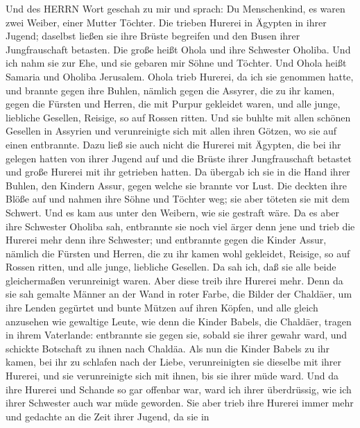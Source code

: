  Und des HERRN Wort geschah zu mir und sprach: 
Du Menschenkind, es waren zwei Weiber, einer Mutter Töchter.
 Die trieben Hurerei in Ägypten in ihrer Jugend; daselbst
ließen sie ihre Brüste begreifen und den Busen ihrer Jungfrauschaft
betasten.  Die große heißt Ohola und ihre Schwester Oholiba.
Und ich nahm sie zur Ehe, und sie gebaren mir Söhne und Töchter. Und
Ohola heißt Samaria und Oholiba Jerusalem.  Ohola trieb
Hurerei, da ich sie genommen hatte, und brannte gegen ihre Buhlen,
nämlich gegen die Assyrer, die zu ihr kamen,  gegen die
Fürsten und Herren, die mit Purpur gekleidet waren, und alle junge,
liebliche Gesellen, Reisige, so auf Rossen ritten.  Und sie
buhlte mit allen schönen Gesellen in Assyrien und verunreinigte sich mit
allen ihren Götzen, wo sie auf einen entbrannte.  Dazu ließ
sie auch nicht die Hurerei mit Ägypten, die bei ihr gelegen hatten von
ihrer Jugend auf und die Brüste ihrer Jungfrauschaft betastet und große
Hurerei mit ihr getrieben hatten.  Da übergab ich sie in die
Hand ihrer Buhlen, den Kindern Assur, gegen welche sie brannte vor Lust.
 Die deckten ihre Blöße auf und nahmen ihre Söhne und
Töchter weg; sie aber töteten sie mit dem Schwert. Und es kam aus unter
den Weibern, wie sie gestraft wäre.  Da es aber ihre
Schwester Oholiba sah, entbrannte sie noch viel ärger denn jene und
trieb die Hurerei mehr denn ihre Schwester;  und entbrannte
gegen die Kinder Assur, nämlich die Fürsten und Herren, die zu ihr kamen
wohl gekleidet, Reisige, so auf Rossen ritten, und alle junge, liebliche
Gesellen.  Da sah ich, daß sie alle beide gleichermaßen
verunreinigt waren.  Aber diese treib ihre Hurerei mehr.
Denn da sie sah gemalte Männer an der Wand in roter Farbe, die Bilder
der Chaldäer,  um ihre Lenden gegürtet und bunte Mützen auf
ihren Köpfen, und alle gleich anzusehen wie gewaltige Leute, wie denn
die Kinder Babels, die Chaldäer, tragen in ihrem Vaterlande:
 entbrannte sie gegen sie, sobald sie ihrer gewahr ward,
und schickte Botschaft zu ihnen nach Chaldäa.  Als nun die
Kinder Babels zu ihr kamen, bei ihr zu schlafen nach der Liebe,
verunreinigten sie dieselbe mit ihrer Hurerei, und sie verunreinigte
sich mit ihnen, bis sie ihrer müde ward.  Und da ihre
Hurerei und Schande so gar offenbar war, ward ich ihrer überdrüssig, wie
ich ihrer Schwester auch war müde geworden.  Sie aber trieb
ihre Hurerei immer mehr und gedachte an die Zeit ihrer Jugend, da sie in
